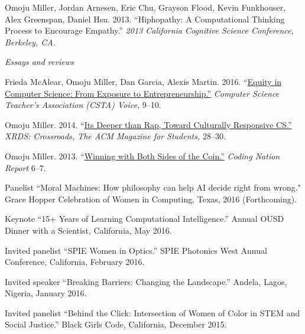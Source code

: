 \documentclass[11pt,article,oneside]{memoir}
\begin{document}
\ind Omoju Miller, Jordan Arnesen, Eric Chu, Grayson Flood, Kevin Funkhouser, Alex Greenspan, Daniel Hsu. 2013. ``Hiphopathy: A Computational Thinking Process to Encourage Empathy.'' \emph{2013 California Cognitive Science Conference, Berkeley, CA.} 
 
\bigskip
\noindent\emph{Essays and reviews \vspace{0.05in}}



\ind Frieda McAlear, Omoju Miller, Dan Garcia, Alexis Martin. 2016. ``\href{http://www.csta.acm.org/Communications/sub/CSTAVoice_Files/csta_voice_01_2016.pdf}{Equity in Computer Science: From Exposure to Entrepreneurship.''} \emph{Computer Science Teacher's Association (CSTA) Voice, } 9--10. 

\ind Omoju Miller. 2014. ``\href{http://dl.acm.org/citation.cfm?id=2604994}{Its Deeper than Rap, Toward Culturally Responsive CS.'' }\emph{XRDS: Crossroads,  The ACM Magazine for Students, } 28--30. 

\ind Omoju Miller. 2013. ``\href{http://kaporcenter.org/wp-content/uploads/2013/10/Kapor_CodingLandscape_R3.pdf}{Winning with Both Sides of the Coin.''} \emph{Coding Nation Report} 6--7. 
 
 \bigskip


\medskip

\ind Panelist ``Moral Machines: How philosophy can help AI decide right from wrong." Grace Hopper Celebration of Women in Computing, Texas, 2016 (Forthcoming).

\ind Keynote ``15+ Years of Learning Computational Intelligence.'' Annual OUSD Dinner with a Scientist, California, May 2016. 

\ind Invited panelist ``SPIE Women in Optics.'' SPIE Photonics West Annual Conference, California, February 2016. 

\ind Invited speaker ``Breaking Barriers: Changing the Landscape.'' Andela, Lagos, Nigeria, January 2016. 

\ind Invited panelist ``Behind the Click: Intersection of Women of Color in STEM and Social Justice.'' Black Girls Code, California, December 2015.
\end{document}
